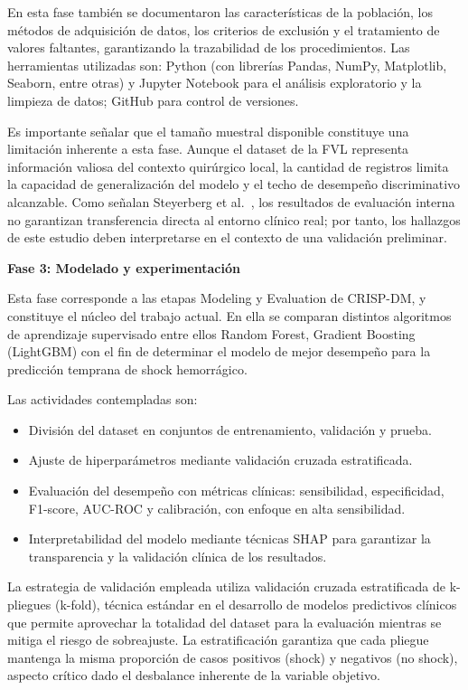 En esta fase también se documentaron las características de la población, los métodos de adquisición de datos, los criterios de exclusión y el tratamiento de valores faltantes, garantizando la trazabilidad de los procedimientos. Las herramientas utilizadas son: Python (con librerías Pandas, NumPy, Matplotlib, Seaborn, entre otras) y Jupyter Notebook para el análisis exploratorio y la limpieza de datos; GitHub para control de versiones.

Es importante señalar que el tamaño muestral disponible constituye una limitación inherente a esta fase. Aunque el dataset de la FVL representa información valiosa del contexto quirúrgico local, la cantidad de registros limita la capacidad de generalización del modelo y el techo de desempeño discriminativo alcanzable. Como señalan Steyerberg et al.\ \cite{steyerberg2018}, los resultados de evaluación interna no garantizan transferencia directa al entorno clínico real; por tanto, los hallazgos de este estudio deben interpretarse en el contexto de una validación preliminar.

\textbf{Fase 3: Modelado y experimentación}

Esta fase corresponde a las etapas Modeling y Evaluation de CRISP-DM, y constituye el núcleo del trabajo actual. En ella se comparan distintos algoritmos de aprendizaje supervisado entre ellos Random Forest, Gradient Boosting (LightGBM) con el fin de determinar el modelo de mejor desempeño para la predicción temprana de shock hemorrágico.

Las actividades contempladas son:

\begin{itemize}
    \item División del dataset en conjuntos de entrenamiento, validación y prueba.
    \item Ajuste de hiperparámetros mediante validación cruzada estratificada.
    \item Evaluación del desempeño con métricas clínicas: sensibilidad, especificidad, F1-score, AUC-ROC y calibración, con enfoque en alta sensibilidad.
    \item Interpretabilidad del modelo mediante técnicas SHAP para garantizar la transparencia y la validación clínica de los resultados.
\end{itemize}

La estrategia de validación empleada utiliza validación cruzada estratificada de k-pliegues (k-fold), técnica estándar en el desarrollo de modelos predictivos clínicos que permite aprovechar la totalidad del dataset para la evaluación mientras se mitiga el riesgo de sobreajuste. La estratificación garantiza que cada pliegue mantenga la misma proporción de casos positivos (shock) y negativos (no shock), aspecto crítico dado el desbalance inherente de la variable objetivo.

